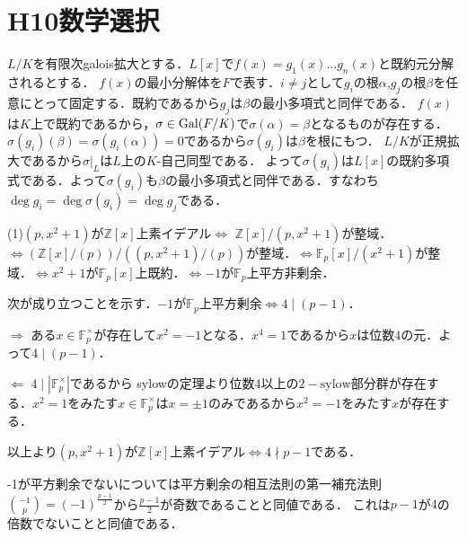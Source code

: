 \documentclass[
		book,
		head_space=20mm,
		foot_space=20mm,
		gutter=10mm,
		line_length=190mm
]{jlreq}
\begin{document}
\section{H10数学選択}
$L/K$を有限次galois拡大とする．$L[x]$で$f(x)=g_1(x)\dots g_n(x)$と既約元分解されるとする．
$f(x)$の最小分解体を$F$で表す．$i\neq j$として$g_i$の根$\alpha$,$g_j$の根$\beta$を任意にとって固定する．既約であるから$g_j$は$\beta$の最小多項式と同伴である．
$f(x)$は$K$上で既約であるから，$\sigma \in \mathop{\mathrm{Gal}}(F/K)$で$\sigma(\alpha)=\beta$となるものが存在する．
$\sigma(g_i)(\beta)=\sigma(g_i(\alpha))=0$であるから$\sigma(g_i)$は$\beta$を根にもつ．
$L/K$が正規拡大であるから$\sigma|_L$は$L$上の$K$-自己同型である．
よって$\sigma(g_i)$は$L[x]$の既約多項式である．よって$\sigma(g_i)$も$\beta$の最小多項式と同伴である．すなわち$\deg g_i =\deg \sigma(g_i)=\deg g_j$である．

(1)$(p,x^2+1)$が$\mathbb{Z}[x]$上素イデアル$\Leftrightarrow$ $\mathbb{Z}[x]/(p,x^2+1)$が整域．$\Leftrightarrow( \mathbb{Z}[x]/(p)) /((p,x^2+1)/(p))$が整域．$\Leftrightarrow \mathbb{F}_p[x]/(x^2+1)$が整域．$\Leftrightarrow x^2+1$が$\mathbb{F}_p[x]$上既約．$\Leftrightarrow -1$が$\mathbb{F}_p$上平方非剰余．

次が成り立つことを示す．$-1$が$\mathbb{F}_p$上平方剰余$\Leftrightarrow 4\mathrel{\mid} (p-1)$．

$\Rightarrow$ ある$x \in \mathbb{F}_p^\times$が存在して$x^2=-1$となる．$x^4=1$であるから$x$は位数$4$の元．よって$4\mathrel{\mid} (p-1)$．

$\Leftarrow$ $4\mathrel{\mid} |\mathbb{F}_p^\times|$であるから sylowの定理より位数$4$以上の$2-  \mathrm{sylow}$部分群が存在する．$x^2=1$をみたす$x\in  \mathbb{F}_p^\times$は$x=\pm{1}$のみであるから$x^2=-1$をみたす$x$が存在する．

以上より$(p,x^2+1)$が$\mathbb{Z}[x]$上素イデアル$\Leftrightarrow 4\mathrel{\nmid} p-1$である．

\begin{tcolorbox}[blanker,breakable,
	left=3mm,right=3mm,
	top=3mm,bottom=3mm,
	before skip=15pt,after skip=15pt,
	borderline vertical={1pt}{0pt}{black,dotted}]
	-1が平方剰余でないについては平方剰余の相互法則の第一補充法則$\binom{-1}{p}=(-1)^{\frac{p-1}{2}}$から$\frac{p-1}{2}$が奇数であることと同値である．
    これは$p-1$が$4$の倍数でないことと同値である．
	\end{tcolorbox}
\end{document}
